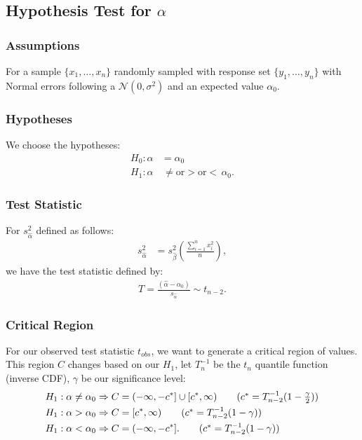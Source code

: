 \documentclass[a4paper, 12pt, twoside]{article}
\begin{document}
\newpage

\subsection{Hypothesis Test for $\alpha$}

\subsubsection{Assumptions}

For a sample $\{x_1, \ldots, x_n\}$ randomly sampled with response
set $\{y_1, \ldots, y_n\}$ with Normal errors following a
$\mathcal{N}(0, \sigma^2)$ and an expected value $\alpha_0$.

\subsubsection{Hypotheses}

We choose the hypotheses:
\begin{align*}
    H_0 : \alpha & = \alpha_0                                   \\
    H_1 : \alpha & \, \neq \text{or} > \text{or} < \, \alpha_0.
\end{align*}

\subsubsection{Test Statistic}

For $s_{\hat\alpha}^2$ defined as follows:
\begin{align}
    s_{\hat\alpha}^2 & = s_{\hat\beta}^2 
        \left(\frac{\sum_{i = 1}^n x_i^2}{n}\right),
\end{align}
we have the test statistic defined by:
\begin{align*}
    T = \frac{(\hat\alpha - \alpha_0)}{s_{\hat\alpha}}
    \sim t_{n - 2}.
\end{align*}

\subsubsection{Critical Region}

For our observed test statistic $t_{obs}$, we want to generate a
critical region of values. This region $C$ changes based on our
$H_1$, let $T^{-1}_n$ be the $t_n$ quantile function
(inverse CDF), $\gamma$ be our significance level:
\begin{align*}
    H_1 : \alpha \neq \alpha_0 & \Rightarrow
    C = (-\infty, -c^*] \cup [c^*, \infty)
    \tag{$ c^* = T_{n-2}^{-1}(1 - \frac{\gamma}{2}) $} \\
    H_1 : \alpha > \alpha_0    & \Rightarrow
    C = [c^*, \infty)
    \tag{$ c^* = T_{n-2}^{-1}(1 - \gamma) $}           \\
    H_1 : \alpha < \alpha_0    & \Rightarrow
    C = (-\infty, -c^*].
    \tag{$ c^* = T_{n-2}^{-1}(1 - \gamma) $}
\end{align*}
\end{document}
